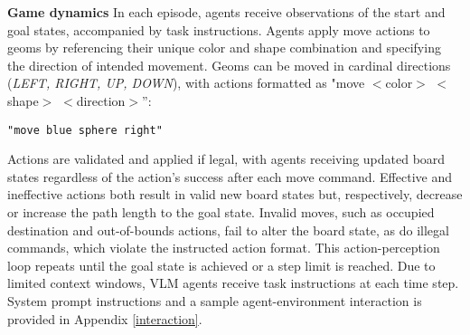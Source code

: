 \textbf{Game dynamics}\hspace{.3cm} In each episode, agents receive observations of the start and goal states, accompanied by task instructions. Agents apply move actions to geoms by referencing their unique color and shape combination and specifying the direction of intended movement. Geoms can be moved in cardinal directions (\textit{LEFT, RIGHT, UP, DOWN}), with actions formatted as "move $<$color$>$ $<$shape$>$ $<$direction$>$”:

\begin{verbatim}
"move blue sphere right"
\end{verbatim}

Actions are validated and applied if legal, with agents receiving updated board states regardless of the action’s success after each move command. Effective
and ineffective actions both result in valid new board states
but, respectively, decrease or increase the path length to
the goal state. Invalid moves, such as occupied destination
and out-of-bounds actions, fail to alter the board state, as
do illegal commands, which violate the instructed action
format. This action-perception loop repeats until the goal state is achieved or a step limit is reached. Due to limited context windows, VLM agents receive task instructions at each time step. System prompt instructions and a sample agent-environment interaction is provided in Appendix \ref{interaction}.
